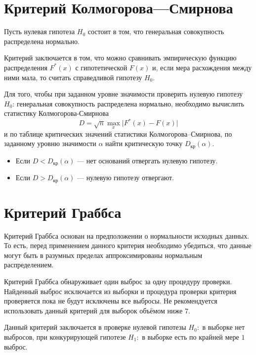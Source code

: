 
\section*{Критерий Колмогорова---Смирнова} %
\label{sec:kolm_smirn}

Пусть нулевая гипотеза $H_0$ состоит в том, что генеральная совокупность распределена нормально.

Критерий заключается в том, что можно сравнивать эмпирическую функцию распределения $F^{*}(x)$ с гипотетической $F(x)$ и, если мера расхождения между ними мала, то считать справедливой гипотезу $H_0$.

Для того, чтобы при заданном уровне значимости проверить нулевую гипотезу $H_0$: генеральная совокупность распределена нормально, необходимо вычислить статистику Колмогорова-Смирнова 
\begin{equation*}
	D = \sqrt{n}\max_{x} \vert F^{*}(x) - F(x) \vert 
\end{equation*}
и по таблице критических значений статистики Колмогорова--Смирнова, по заданному уровню значимости $\alpha$ найти критическую точку $D_{\textrm{кр}}(\alpha)$.
\begin{itemize}
	\item Если $D < D_{\textrm{кр}}(\alpha)$ --- нет оснований отвергать нулевую гипотезу.
	\item Если $D > D_{\textrm{кр}}(\alpha)$ --- нулевую гипотезу отвергают.
\end{itemize}


\section*{Критерий Граббса} %
\label{sec:grabbs}

Критерий Граббса основан на предположении о нормальности исходных данных. То есть, перед применением данного критерия необходимо убедиться, что данные могут быть в разумных пределах аппроксимированы нормальным распределением.

Критерий Граббса обнаруживает один выброс за одну процедуру проверки. Найденный выброс исключается из выборки и процедура проверки критерия проверяется пока не будут исключены все выбросы. Не рекомендуется использовать данный критерий для выборок объёмом ниже 7.

Данный критерий заключается в проверке нулевой гипотезы $H_0:$ в выборке нет выбросов, при конкурирующей гипотезе $H_1:$ в выборке есть по крайней мере $1$ выброс.

